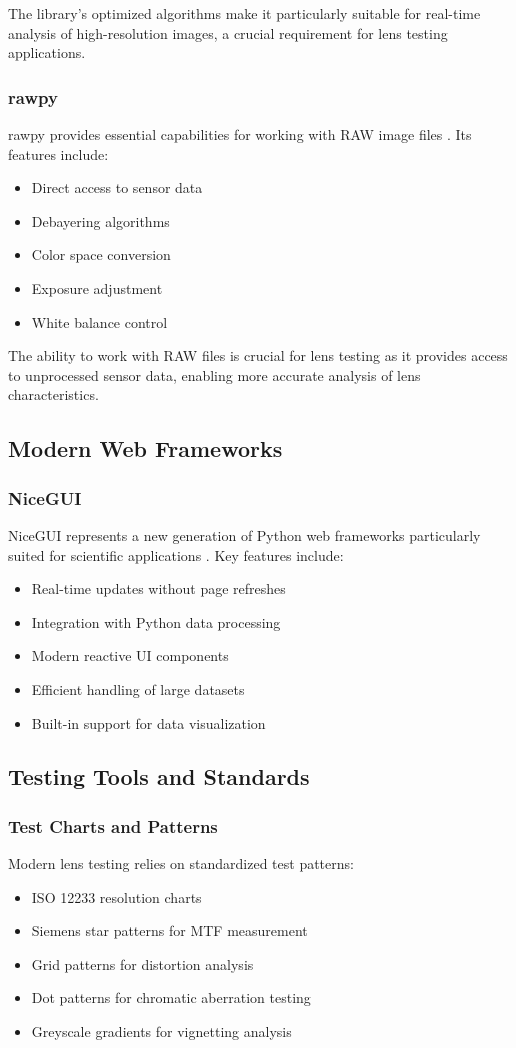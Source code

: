 The library's optimized algorithms make it particularly suitable for real-time analysis of high-resolution images, a crucial requirement for lens testing applications.

\subsubsection{rawpy}
rawpy provides essential capabilities for working with RAW image files \cite{rawpy}. Its features include:
\begin{itemize}
    \item Direct access to sensor data
    \item Debayering algorithms
    \item Color space conversion
    \item Exposure adjustment
    \item White balance control
\end{itemize}

The ability to work with RAW files is crucial for lens testing as it provides access to unprocessed sensor data, enabling more accurate analysis of lens characteristics.

\subsection{Modern Web Frameworks}
\subsubsection{NiceGUI}
NiceGUI represents a new generation of Python web frameworks particularly suited for scientific applications \cite{nicegui}. Key features include:
\begin{itemize}
    \item Real-time updates without page refreshes
    \item Integration with Python data processing
    \item Modern reactive UI components
    \item Efficient handling of large datasets
    \item Built-in support for data visualization
\end{itemize}

\subsection{Testing Tools and Standards}
\subsubsection{Test Charts and Patterns}
Modern lens testing relies on standardized test patterns:
\begin{itemize}
    \item ISO 12233 resolution charts
    \item Siemens star patterns for MTF measurement
    \item Grid patterns for distortion analysis
    \item Dot patterns for chromatic aberration testing
    \item Greyscale gradients for vignetting analysis
\end{itemize}

